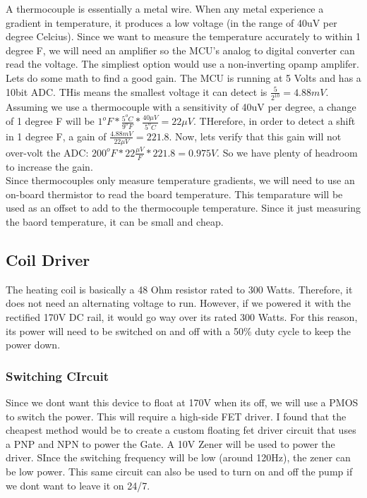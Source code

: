 \documentclass[12pt,letterpaper]{article}
\begin{document}
A thermocouple is essentially a metal wire.
When any metal experience a gradient in temperature, it produces a low voltage (in the range of 40uV per degree Celcius).
Since we want to measure the temperature accurately to within 1 degree F, we will need an amplifier so the MCU's analog to digital converter can read the voltage.
The simpliest option would use a non-inverting opamp amplifer.\\

Lets do some math to find a good gain.  
The MCU is running at 5 Volts and has a 10bit ADC.  
THis means the smallest voltage it can detect is $ \frac{5}{2^{10}} = 4.88 mV $.
Assuming we use a thermocouple with a sensitivity of 40uV per degree, a change of 1 degree F will be
$1^oF * \frac{5^oC}{9^oF} * \frac{40 \mu V}{5^oC} = 22 \mu V$.
THerefore, in order to detect a shift in 1 degree F, a gain of $\frac{4.88 mV}{22 \mu V} = 221.8$.
Now, lets verify that this gain will not over-volt the ADC: $200^oF * 22\frac{\mu V}{F} * 221.8 = 0.975 V$.
So we have plenty of headroom to increase the gain.\\

Since thermocouples only measure temperature gradients, we will need to use an on-board thermistor to read the board temperature.
This temparature will be used as an offset to add to the thermocouple temperature.
Since it just measuring the baord temperature, it can be small and cheap.



\subsection{Coil Driver}
The heating coil is basically a 48 Ohm resistor rated to 300 Watts.
Therefore, it does not need an alternating voltage to run.
However, if we powered it with the rectified 170V DC rail, it would go way over its rated 300 Watts.
For this reason, its power will need to be switched on and off with a 50\% duty cycle to keep the power down.\\
\subsubsection{Switching CIrcuit}
Since we dont want this device to float at 170V when its off, we will use a PMOS to switch the power.
This will require a high-side FET driver.
I found that the cheapest method would be to create a custom floating fet driver circuit that uses a PNP and NPN to power the Gate.  A 10V Zener will be used to power the driver.
SInce the switching frequency will be low (around 120Hz), the zener can be low power.
This same circuit can also be used to turn on and off the pump if we dont want to leave it on 24/7.
\end{document}
